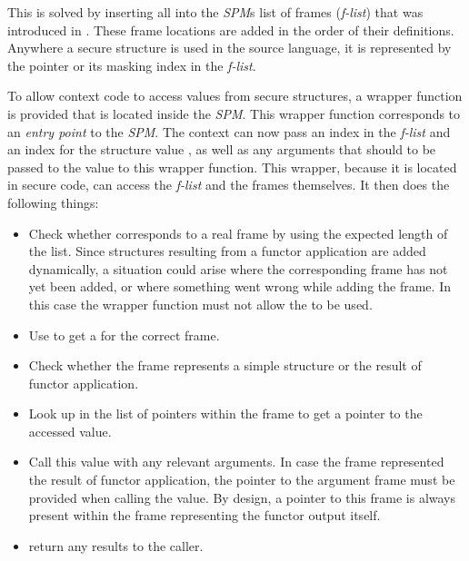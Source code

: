 This is solved by inserting all  into the \emph{SPM}s list of frames (\emph{f-list}) that was introduced in . These frame locations are added in the order of their definitions. 
Anywhere a secure structure is used in the source language, it is represented by the  pointer or its masking index in the \emph{f-list}.

To allow context code to access values from secure structures, a wrapper function is provided that is located inside the \emph{SPM}.
This wrapper function corresponds to an \emph{entry point} to the \emph{SPM}.
The context can now pass an index in the \emph{f-list}  and an index for the structure value , as well as any arguments that should to be passed to the value to this wrapper function.
This wrapper, because it is located in secure code, can access the \emph{f-list} and the frames themselves.
It then does the following things:
\begin{itemize}
\item Check whether  corresponds to a real frame by using the expected length of the list.
Since structures resulting from a functor application are added dynamically, a situation could arise where the corresponding frame has not yet been added, or where something went wrong while adding the frame.
In this case the wrapper function must not allow the  to be used.
\item Use  to get a  for the correct frame.
\item Check whether the frame represents a simple structure or the result of functor application.
\item Look up  in the list of pointers within the frame to get a pointer to the accessed value.
\item Call this value with any relevant arguments.
In case the frame represented the result of functor application, the pointer to the argument frame must be provided when calling the value.
By design, a pointer to this frame is always present within the frame representing the functor output itself.
\item return any results to the caller.
\end{itemize}

